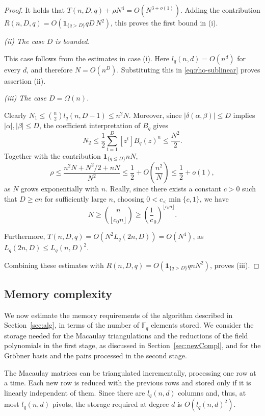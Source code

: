 \documentclass[a4paper, 12pt, oneside, openright]{article}
\begin{document}
\begin{proof}
\smallskip
\noindent
It holds that $T(n,D,q)+\rho N^4=O(N^{3+o(1)})$. Adding the contribution $R(n,D,q)= O(\mathbf 1_{\{q>D\}}qD\,N^2)$, this proves the first bound in (i).

\medskip
\noindent\textit{(ii) The case $D$ is bounded.}

\smallskip
\noindent
This case follows from the estimates in case (i). Here $l_q(n,d)= O(n^d)$  for every $d$, and therefore $N= O(n^D).$ Substituting this in \eqref{eq:rho-sublinear}  proves assertion (ii).
 
\medskip
\noindent\textit{(iii) The case $D=\Omega(n)$.}

\smallskip
\noindent
Clearly $N_1 \le \binom{n}{2}l_q(n,D-1)\le n^2N$.
Moreover, since $|\delta(\alpha,\beta)|\le D$ implies $|\alpha|,|\beta|\le D$, the coefficient interpretation of $B_q$ gives
\[
N_2\le \frac 12 \sum_{t=1}^D[z^t]B_q(z)^n\le \frac{N^2}{2}.
\]
Together with the contribution $\mathbf{1}_{\{q\le D\}}nN$, 
\[
\rho\le \frac{n^2N+N^2/2+nN}{N^2}\le\frac12+O\left(\frac{n^2}{N}\right) \le \frac 12 +o(1),
\]
as $N$ grows exponentially with $n$.
Really, since there exists a constant $c>0$ such that $D\ge cn$ for sufficiently large $n$,
choosing $0<c_<\min\{c,1\}$, we have 
\[N\ge\binom{n}{\lfloor c_0n\rfloor} \ge \left( \frac 1c_0 \right)^{\lfloor c_0n\rfloor}.\]

\smallskip
\noindent
Furthermore, $T(n,D,q)=O(N^2L_q(2n,D))=O(N^4)$, as $L_q(2n,D)\le L_q(n,D)^2$.

\smallskip
\noindent
Combining these estimates with $R(n,D,q)=O\left(\mathbf{1}_{\{q>D\}}qnN^2\right)$, proves (iii).

\end{proof}


\subsection{Memory complexity}\label{sec:mem}

We now estimate the memory requirements of the algorithm described in Section~\ref{sec:alg}, in terms of the number of $\mathbb{F}_q$ elements stored. We consider the storage needed for the Macaulay triangulations and the reductions of the field polynomials in the first stage, as discussed in Section~\ref{sec:newCompl}, and for the Gr\"{o}bner basis and the pairs processed in the second stage.


The Macaulay matrices can be triangulated incrementally, processing one row at a time. Each new row is reduced with the previous rows and stored only if it is linearly independent of them. Since there are $l_q(n,d)$ columns and, thus, at most $l_q(n,d)$ pivots,  the storage required at degree $d$ is $O(l_q(n,d)^2)$.
\end{document}
